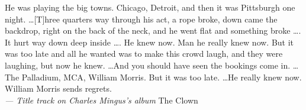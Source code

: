 %
%
%



%
%

\begin{flushright}
  \begin{minipage}[]{0.6\linewidth}
    \begin{flushright}
      He was playing the big towns. Chicago, Detroit, and then it was Pittsburgh one night. \dots [T]hree quarters way through his act,
      a rope broke, down came the backdrop, right on the back of the neck, and he went flat and something broke \dots . It hurt way
      down deep inside \dots . He knew now. Man he really knew now. But it was too late and all he wanted was to make this crowd laugh,
      and they were laughing, but now he knew. \dots And you should have seen the bookings come in. \dots The Palladium, MCA, William
      Morris. But it was too late. \dots He really knew now. William Morris sends regrets. \\{\small
        \emph{--- Title track on Charles Mingus's album } The Clown}
    \end{flushright}
  \end{minipage}
\end{flushright}
\vspace{\baselineskip}

